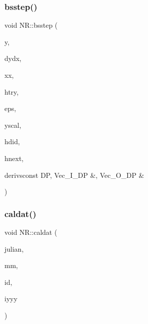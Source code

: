 \subsubsection{\texorpdfstring{bsstep()}{bsstep()}}
{\footnotesize\ttfamily void N\+R\+::bsstep (\begin{DoxyParamCaption}\item[{\mbox{\hyperlink{namespaceNR_ab293e06a6bf799d8a7ed932b6852bcb8}{Vec\+\_\+\+I\+O\+\_\+\+DP}} \&}]{y,  }\item[{\mbox{\hyperlink{namespaceNR_ab293e06a6bf799d8a7ed932b6852bcb8}{Vec\+\_\+\+I\+O\+\_\+\+DP}} \&}]{dydx,  }\item[{\mbox{\hyperlink{namespaceNR_af6ff762dd605ff477b8e52387253a02a}{DP}} \&}]{xx,  }\item[{const \mbox{\hyperlink{namespaceNR_af6ff762dd605ff477b8e52387253a02a}{DP}}}]{htry,  }\item[{const \mbox{\hyperlink{namespaceNR_af6ff762dd605ff477b8e52387253a02a}{DP}}}]{eps,  }\item[{\mbox{\hyperlink{namespaceNR_a9f943da53862537c552e2a770cb170ae}{Vec\+\_\+\+I\+\_\+\+DP}} \&}]{yscal,  }\item[{\mbox{\hyperlink{namespaceNR_af6ff762dd605ff477b8e52387253a02a}{DP}} \&}]{hdid,  }\item[{\mbox{\hyperlink{namespaceNR_af6ff762dd605ff477b8e52387253a02a}{DP}} \&}]{hnext,  }\item[{void }]{derivsconst D\+P, Vec\+\_\+\+I\+\_\+\+D\+P \&, Vec\+\_\+\+O\+\_\+\+D\+P \& }\end{DoxyParamCaption})}

\mbox{\label{namespaceNR_ad0042558c0003dd2b235a92f031d84f8}} 
\subsubsection{\texorpdfstring{caldat()}{caldat()}}
{\footnotesize\ttfamily void N\+R\+::caldat (\begin{DoxyParamCaption}\item[{const int}]{julian,  }\item[{int \&}]{mm,  }\item[{int \&}]{id,  }\item[{int \&}]{iyyy }\end{DoxyParamCaption})}

\mbox{\label{namespaceNR_a139dd9db85bba8d70c67d174413b5837}} 
